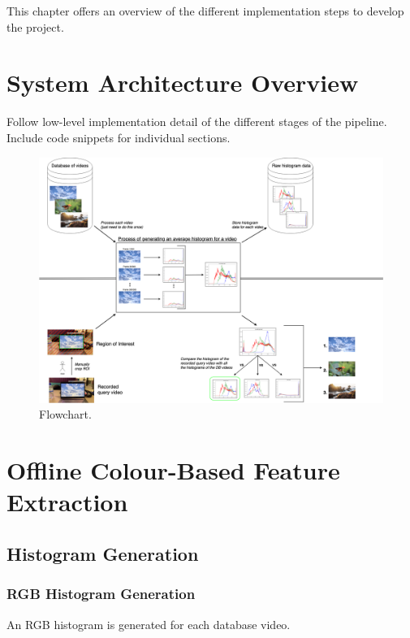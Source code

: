 This chapter offers an overview of the different implementation steps to develop the project.

\section{System Architecture Overview}

Follow low-level implementation detail of the different stages of the pipeline.\\

Include code snippets for individual sections.

\begin{figure}[h] 
\centerline{\includegraphics[width=\textwidth]{figures/implementation/CBVR-flowchart.png}}
\caption{\label{fig:CBVR flowchart}Flowchart.}
\end{figure}

\section{Offline Colour-Based Feature Extraction}

\subsection{Histogram Generation}

\subsubsection{RGB Histogram Generation}

An RGB histogram is generated for each database video. 


